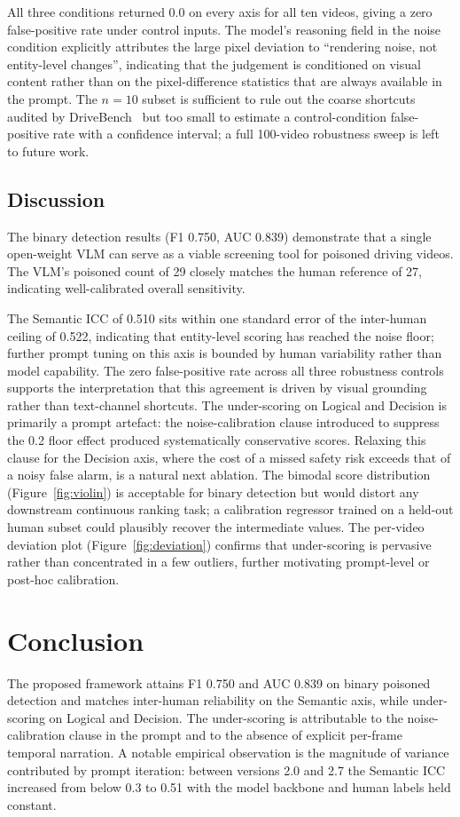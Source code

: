 \documentclass[letterpaper]{article}
\begin{document}
All three conditions returned $0.0$ on every axis for all ten videos,
giving a zero false-positive rate under control inputs. The model's
reasoning field in the noise condition explicitly attributes the
large pixel deviation to ``rendering noise, not entity-level
changes'', indicating that the judgement is conditioned on visual
content rather than on the pixel-difference statistics that are
always available in the prompt. The $n\!=\!10$ subset is sufficient
to rule out the coarse shortcuts audited by
DriveBench~\citep{xie2024drivebench} but too small to estimate a
control-condition false-positive rate with a confidence interval; a
full 100-video robustness sweep is left to future work.

\subsection{Discussion}
The binary detection results (F1 0.750, AUC 0.839) demonstrate that
a single open-weight VLM can serve as a viable screening tool for
poisoned driving videos. The VLM's poisoned count of 29 closely
matches the human reference of 27, indicating well-calibrated
overall sensitivity.

The Semantic ICC of 0.510 sits within one standard error of the
inter-human ceiling of 0.522, indicating that entity-level scoring
has reached the noise floor; further prompt tuning on this axis is
bounded by human variability rather than model capability. The zero
false-positive rate across all three robustness controls supports the
interpretation that this agreement is driven by visual grounding
rather than text-channel shortcuts. The under-scoring on Logical and
Decision is primarily a prompt artefact: the noise-calibration clause
introduced to suppress the 0.2 floor effect produced systematically
conservative scores. Relaxing this clause for the Decision axis,
where the cost of a missed safety risk exceeds that of a noisy false
alarm, is a natural next ablation. The bimodal score distribution
(Figure~\ref{fig:violin}) is acceptable for binary detection but
would distort any downstream continuous ranking task; a calibration
regressor trained on a held-out human subset could plausibly recover
the intermediate values. The per-video deviation plot
(Figure~\ref{fig:deviation}) confirms that under-scoring is pervasive
rather than concentrated in a few outliers, further motivating
prompt-level or post-hoc calibration.

\section{Conclusion}
The proposed framework attains F1 0.750 and AUC 0.839 on binary
poisoned detection and matches inter-human reliability on the
Semantic axis, while under-scoring on Logical and Decision. The under-scoring is
attributable to the noise-calibration clause in the prompt and to
the absence of explicit per-frame temporal narration. A notable
empirical observation is the magnitude of variance contributed by
prompt iteration: between versions 2.0 and 2.7 the Semantic ICC
increased from below 0.3 to 0.51 with the model backbone and human
labels held constant.
\end{document}
